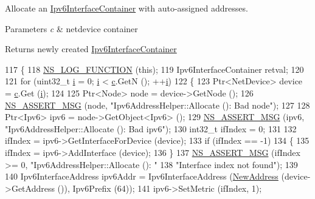 Allocate an \hyperlink{classns3_1_1Ipv6InterfaceContainer}{Ipv6\+Interface\+Container} with auto-\/assigned addresses. 


\begin{DoxyParams}{Parameters}
{\em c} & netdevice container \\
\hline
\end{DoxyParams}
\begin{DoxyReturn}{Returns}
newly created \hyperlink{classns3_1_1Ipv6InterfaceContainer}{Ipv6\+Interface\+Container} 
\end{DoxyReturn}

\begin{DoxyCode}
117 \{
118   \hyperlink{log-macros-disabled_8h_a90b90d5bad1f39cb1b64923ea94c0761}{NS\_LOG\_FUNCTION} (\textcolor{keyword}{this});
119   Ipv6InterfaceContainer retval;
120 
121   \textcolor{keywordflow}{for} (uint32\_t \hyperlink{bernuolliDistribution_8m_a6f6ccfcf58b31cb6412107d9d5281426}{i} = 0; \hyperlink{bernuolliDistribution_8m_a6f6ccfcf58b31cb6412107d9d5281426}{i} < \hyperlink{lte_2model_2fading-traces_2fading__trace__generator_8m_ae0323a9039add2978bf5b49550572c7c}{c}.GetN (); ++\hyperlink{bernuolliDistribution_8m_a6f6ccfcf58b31cb6412107d9d5281426}{i}) 
122     \{
123       Ptr<NetDevice> device = \hyperlink{lte_2model_2fading-traces_2fading__trace__generator_8m_ae0323a9039add2978bf5b49550572c7c}{c}.Get (\hyperlink{bernuolliDistribution_8m_a6f6ccfcf58b31cb6412107d9d5281426}{i});
124 
125       Ptr<Node> node = device->GetNode ();
126       \hyperlink{assert_8h_aff5ece9066c74e681e74999856f08539}{NS\_ASSERT\_MSG} (node, \textcolor{stringliteral}{"Ipv6AddressHelper::Allocate (): Bad node"});
127 
128       Ptr<Ipv6> ipv6 = node->GetObject<Ipv6> ();
129       \hyperlink{assert_8h_aff5ece9066c74e681e74999856f08539}{NS\_ASSERT\_MSG} (ipv6, \textcolor{stringliteral}{"Ipv6AddressHelper::Allocate (): Bad ipv6"});
130       int32\_t ifIndex = 0;
131 
132       ifIndex = ipv6->GetInterfaceForDevice (device);
133       \textcolor{keywordflow}{if} (ifIndex == -1)
134         \{
135           ifIndex = ipv6->AddInterface (device);
136         \}
137       \hyperlink{assert_8h_aff5ece9066c74e681e74999856f08539}{NS\_ASSERT\_MSG} (ifIndex >= 0, \textcolor{stringliteral}{"Ipv6AddressHelper::Allocate (): "}
138                      \textcolor{stringliteral}{"Interface index not found"});
139 
140       Ipv6InterfaceAddress ipv6Addr = Ipv6InterfaceAddress (\hyperlink{classns3_1_1Ipv6AddressHelper_a5f3df4b8e9d41e4241f2334381c2c883}{NewAddress} (device->GetAddress ()), 
      Ipv6Prefix (64));
141       ipv6->SetMetric (ifIndex, 1);

\end{DoxyCode}
